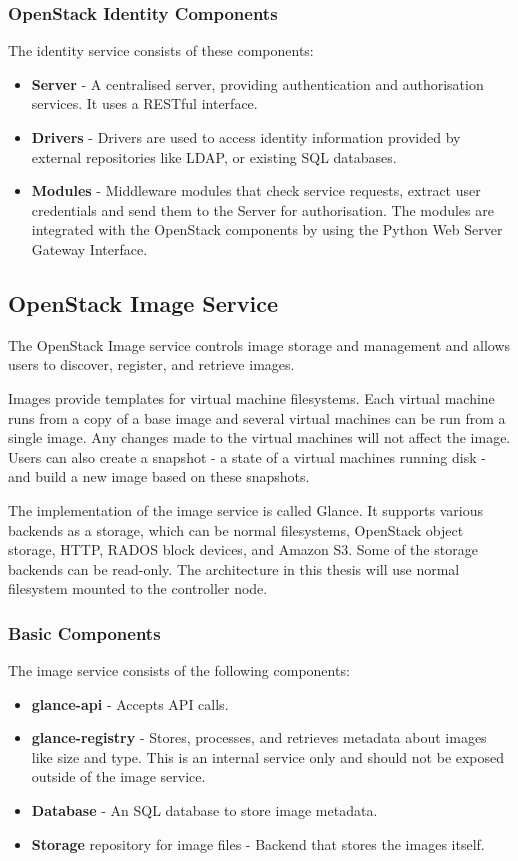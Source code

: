 \subsubsection*{OpenStack Identity Components}

The identity service consists of these components:
\begin{itemize}
  \item{\textbf{Server} - A centralised server, providing authentication and authorisation services. It uses a RESTful interface.}
  \item{\textbf{Drivers} - Drivers are used to access identity information provided by external repositories like LDAP, or existing SQL databases.}
  \item{\textbf{Modules} - Middleware modules that check service requests, extract user credentials and send them to the Server for authorisation. The modules are integrated with the OpenStack components by using the Python Web Server Gateway Interface.}
 \\\cite{InstallGuide}
\end{itemize}


\subsection{OpenStack Image Service}
The OpenStack Image service controls image storage and management and allows users to discover, register, and retrieve images.

Images provide templates for virtual machine filesystems. Each virtual machine runs from a copy of a base image and several virtual machines can be run from a single image. Any changes made to the virtual machines will not affect the image. Users can also create a snapshot - a state of a virtual machines running disk - and build a new image based on these snapshots.

The implementation of the image service is called Glance. It supports various backends as a storage, which can be normal filesystems, OpenStack object storage, HTTP, RADOS block devices, and Amazon S3. Some of the storage backends can be read-only. The architecture in this thesis will use normal filesystem mounted to the controller node.

\subsubsection*{Basic Components}
The image service consists of the following components:
\begin{itemize}
  \item{\textbf{glance-api} - Accepts API calls.}
  \item{\textbf{glance-registry} - Stores, processes, and retrieves metadata about images like size and type. This is an internal service only and should not be exposed outside of the image service.}
  \item{\textbf{Database} - An SQL database to store image metadata.}
  \item{\textbf{Storage} repository for image files - Backend that stores the images itself.}
\end{itemize}





